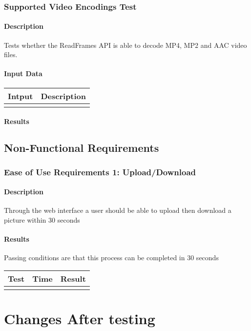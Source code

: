 \documentclass{scrreprt}
\begin{document}
\subsection{Supported Video Encodings Test}
\subsubsection{Description}
Tests whether the ReadFrames API is able to decode MP4, MP2 and AAC video files.
\subsubsection{Input Data}
 \centering
 \begin{tabular}{p{3cm}p{6cm}}
 \hline\hline
 Intput & Description\\
 \hline\hline
   &  \\ %
 \hline
 \end{tabular}
\subsubsection{Results}

\section{Non-Functional Requirements}
\subsection{Ease of Use Requirements 1: Upload/Download}
\subsubsection{Description}
Through the web interface a user should be able to upload then download a picture within 30 seconds
\subsubsection{Results}
Passing conditions are that this process can be completed in 30 seconds
 \centering
 \begin{tabular}{||p{1.5cm}|p{1.5cm}|p{1.5cm}||}
 \hline
 \bf Test & \bf Time & \bf Result \\
 \hline\hline
   &  & \\ %
 \hline
 \end{tabular}

\chapter{Changes After testing}
\end{document}
